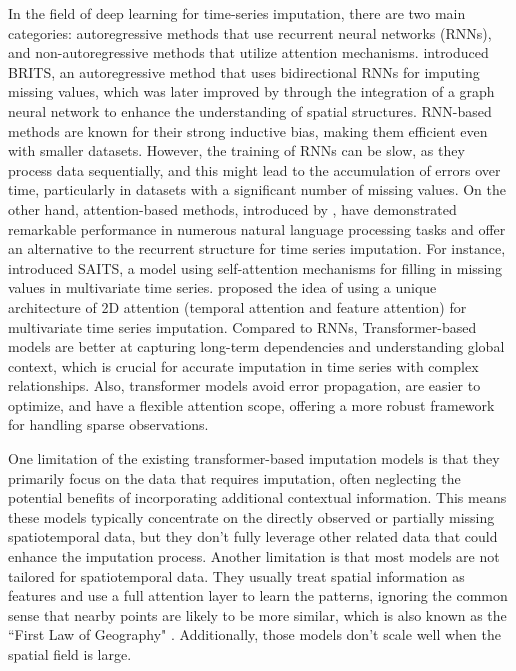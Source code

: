 \documentclass[11pt]{article}
\begin{document}
 In the field of deep learning for time-series imputation, there are two main categories: autoregressive methods that use recurrent neural networks (RNNs), and non-autoregressive methods that utilize attention mechanisms. \citet{cao2018brits} introduced BRITS, an autoregressive method that uses bidirectional RNNs for imputing missing values, which was later improved by \citet{cini2021filling} through the integration of a graph neural network to enhance the understanding of spatial structures. RNN-based methods are known for their strong inductive bias, making them efficient even with smaller datasets. However, the training of RNNs can be slow, as they process data sequentially, and this might lead to the accumulation of errors over time, particularly in datasets with a significant number of missing values. On the other hand, attention-based methods, introduced by \citet{vaswani2017attention}, have demonstrated remarkable performance in numerous natural language processing tasks and offer an alternative to the recurrent structure for time series imputation. For instance, \citet{du2023saits} introduced SAITS, a model using self-attention mechanisms for filling in missing values in multivariate time series. \citet{tashiro2021csdi} proposed the idea of using a unique architecture of 2D attention (temporal attention and feature attention) for multivariate time series imputation. Compared to RNNs, Transformer-based models are better at capturing long-term dependencies and understanding global context, which is crucial for accurate imputation in time series with complex relationships. Also, transformer models avoid error propagation, are easier to optimize, and have a flexible attention scope, offering a more robust framework for handling sparse observations. 


One limitation of the existing transformer-based imputation models is that they primarily focus on the data that requires imputation, often neglecting the potential benefits of incorporating additional contextual information. This means these models typically concentrate on the directly observed or partially missing spatiotemporal data, but they don't fully leverage other related data that could enhance the imputation process. Another limitation is that most models are not tailored for spatiotemporal data. They usually treat spatial information as features and use a full attention layer to learn the patterns, ignoring the common sense that nearby points are likely to be more similar, which is also known as the ``First Law of Geography" \citep{tobler1970computer}. Additionally, those models don't scale well when the spatial field is large.
\end{document}
